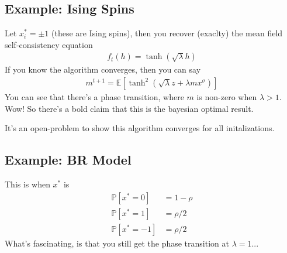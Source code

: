 \subsection{Example: Ising Spins}
Let $x_i^* = \pm 1$ (these are Ising spins), then you recover (exaclty) the mean field self-consistency equation
\begin{align}
	f_t(h) = \tanh(\sqrt{\lambda} h)
\end{align}
If you know the algorithm converges, then you can say
 \begin{align}
 	m^{t+1} = \mathbb E[\tanh^2 (\sqrt{\lambda} z + \lambda m x^\sigma)]
 \end{align}
 You can see that there's a phase transition, where $m$ is non-zero when $\lambda > 1$. Wow! So there's a bold claim that this is the bayesian optimal result.
\begin{sidework}
	It's an open-problem to show this algorithm converges for all initalizations.
\end{sidework}

\subsection{Example: BR Model}
This is when $x^*$ is
\begin{align}
	\mathbb P[x^* = 0] & = 1-\rho\\
	\mathbb P[x^* = 1] & = \rho / 2\\
	\mathbb P[x^* = -1] & = \rho / 2
\end{align}
What's fascinating, is that you still get the phase transition at $\lambda = 1$...

